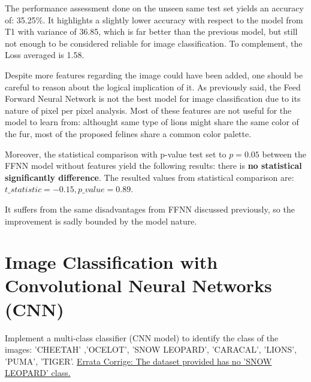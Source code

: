 \documentclass[11pt]{scrartcl}
\begin{document}
The performance assessment done on the unseen same test set 
yields an accuracy of: 35.25\%.
It highlights a slightly lower accuracy 
with respect to the model from T1 with variance of 36.85,
which is far better than the previous model,
but still not enough to be considered reliable for image classification.
To complement, the Loss averaged is 1.58.

Despite more features regarding the image could have been added,
one should be careful to reason about the logical implication of it.
As previously said, the Feed Forward Neural Network 
is not the best model for image classification
due to its nature of pixel per pixel analysis.
Most of these features are not useful for the model to learn from:
althought same type of lions might share the same color of the fur,
most of the proposed felines share a common color palette.

Moreover, the statistical comparison with p-value test set to 
\( p = 0.05 \)
between the FFNN model without features yield 
the following results:
there is \textbf{no statistical significantly difference}. 
The resulted values from statistical comparison are:
\( t\_statistic = -0.15, p\_value = 0.89 \).

It suffers from the same disadvantages from FFNN discussed previously,
so the improvement is sadly bounded by the model nature.

\clearpage

\section{Image Classification with Convolutional Neural Networks (CNN)}

Implement a multi-class classifier (CNN model) to identify the class of the images: 
'CHEETAH' ,'OCELOT', 'SNOW LEOPARD', 'CARACAL', 'LIONS', 'PUMA', 'TIGER'.
\underline{Errata Corrige: The dataset provided has no 'SNOW LEOPARD' class.}
\end{document}
